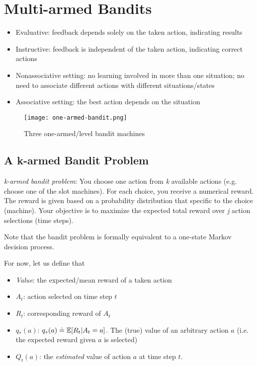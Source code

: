 \documentclass[sutton_barto_notes.tex]{subfiles}
\begin{document}
\newpage
\section{Multi-armed Bandits}
\begin{itemize}
\item Evaluative: feedback depends solely on the taken action, indicating results
\item Instructive: feedback is independent of the taken action, indicating correct actions
\item Nonassociative setting: no learning involved in more than one situation; no need to associate different actions with different situations/states
\item Associative setting: the best action depends on the situation
\end{itemize}

\begin{figure}[!h]
  \texttt{[image: one-armed-bandit.png]}
  \caption{Three one-armed/level bandit machines}
  \label{fig:bandit-machine}
\end{figure}

\subsection{A k-armed Bandit Problem}

\textit{k-armed bandit problem}:
You choose one action from \textit{k} available actions (e.g. choose one of the slot machines). For each choice, you receive a numerical reward. The reward is given based on a probability distribution that specific to the choice (machine). Your objective is to maximize the expected total reward over \textit{j} action selections (time steps).

Note that the bandit problem is formally equivalent to a one-state Markov decision process. 

For now, let us define that
\begin{itemize}
\item \textit{Value}: the expected/mean reward of a taken action
\item $A_t$: action selected on time step $t$
\item $R_t$: corresponding reward of $A_t$
\item $q_{*}(a)$:  $q_{*}(a) \doteq \operatorname*{\mathbb{E}}[R_t|A_t=a]$. The (true) value of an arbitrary action $a$ (i.e. the expected reward given $a$ is selected)
\item $Q_t(a)$: the \textit{estimated} value of action $a$ at time step $t$.
\end{itemize}
\end{document}
